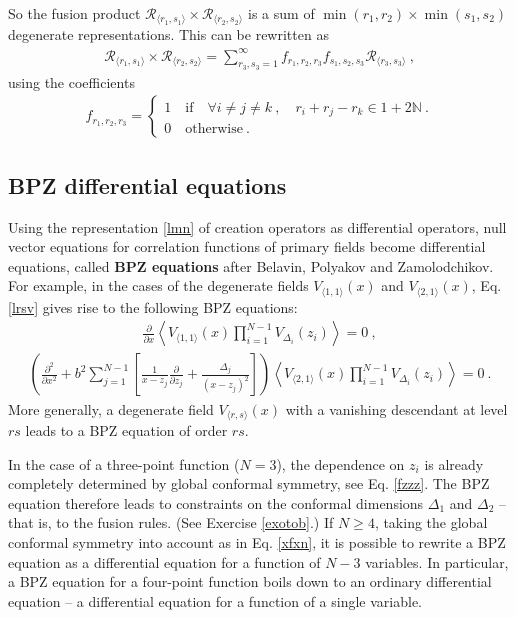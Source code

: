 \documentclass[12pt, a4paper, notitlepage, twoside]{report}
\numberwithin{equation}{section}
\theoremstyle{break}
\begin{document}
So the fusion product $\mathcal{R}_{\langle r_1,s_1 \rangle} \times \mathcal{R}_{\langle r_2,s_2 \rangle}$ is a sum of $\min(r_1,r_2)\times \min(s_1,s_2)$ degenerate representations.
This can be rewritten as 
\begin{align}
\mathcal{R}_{\langle r_1,s_1 \rangle} \times \mathcal{R}_{\langle r_2,s_2 \rangle} = \sum_{r_3,s_3=1}^\infty f_{r_1,r_2,r_3} f_{s_1,s_2,s_3} \mathcal{R}_{\langle r_3,s_3 \rangle}\ ,
 \label{rrrsss}
\end{align}
using the coefficients
\begin{align}
f_{r_1,r_2,r_3} = \left\{\begin{array}{l}  1 \quad \text{if} \quad 
 \forall i\neq j\neq k \ , \quad r_i+r_j-r_k \in 1 + 2{\mathbb{N}}\ .
\\ 0 \quad \text{otherwise} \ .\end{array}\right.  
\label{frrr}
\end{align} 


\subsection{BPZ differential equations \label{secbpz}}

Using the representation \eqref{lmn} of creation operators as differential operators, null vector equations for correlation functions of primary fields become differential equations, called \textbf{\boldmath BPZ equations} after Belavin, Polyakov and Zamolodchikov. 
For example, in the cases of the degenerate fields $V_{\langle 1,1 \rangle}(x)$ and $V_{\langle 2,1 \rangle}(x)$, Eq. \eqref{lrsv} gives rise to the following BPZ equations: 
\begin{align}
 {\frac{\partial}{\partial x}} \left\langle V_{\langle 1,1 \rangle}(x) \prod_{i=1}^{N-1} V_{\Delta_i}(z_i) \right\rangle = 0 \ ,
\label{pvoo} 
\end{align}
\begin{align}
\boxed{\left( \frac{\partial^2}{\partial x^2}  +b^2 \sum_{j=1}^{N-1} \left[\frac{1}{x-z_j}{\frac{\partial}{\partial z_j}}+ \frac{\Delta_j}{(x-z_j)^2} \right]\right)\left\langle V_{\langle 2,1 \rangle}(x) \prod_{i=1}^{N-1} V_{\Delta_i}(z_i) \right\rangle = 0} \ .
\label{pvot}
\end{align}
More generally, a degenerate field $V_{\langle r,s \rangle}(x)$ with a vanishing descendant at level $rs$ leads to a BPZ equation of order $rs$. 

In the case of a three-point function ($N=3$), the dependence on $z_i$ is already completely determined by global conformal symmetry, see Eq. \eqref{fzzz}.
The BPZ equation therefore leads to constraints on the conformal dimensions $\Delta_1$ and $\Delta_2$ -- that is, to the fusion rules. (See Exercise \ref{exotob}.) If $N\geq 4$, taking the global conformal symmetry into account as in Eq. \eqref{xfxn}, it is possible to rewrite a BPZ equation as a differential equation for a function of $N-3$ variables.
In particular, a BPZ equation for a four-point function boils down to an ordinary differential equation -- a differential equation for a function of a single variable.  
\end{document}

